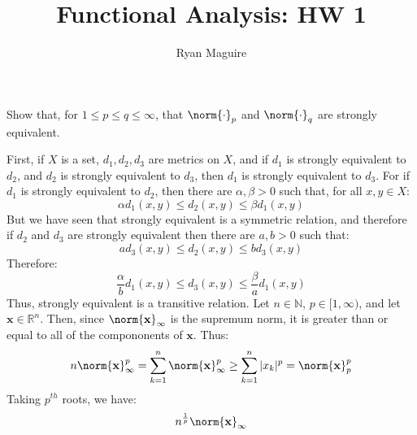 \documentclass[crop=false,class=article,oneside]{standalone}
\begin{document}
    \title{Functional Analysis: HW 1}
    \author{Ryan Maguire}
    \date{\vspace{-5ex}}
    \maketitle
    \setcounter{section}{1}
    \begin{problem}
        Show that, for $1\leq{p}\leq{q}\leq\infty$, that
        $\norm{\cdot}_{p}$ and $\norm{\cdot}_{q}$ are strongly
        equivalent.
    \end{problem}
    \begin{solution}
        First, if $X$ is a set, $d_{1},d_{2},d_{3}$ are metrics on
        $X$, and if $d_{1}$ is strongly equivalent to $d_{2}$, and
        $d_{2}$ is strongly equivalent to $d_{3}$, then $d_{1}$ is
        strongly equivalent to $d_{3}$. For if $d_{1}$ is strongly
        equivalent to $d_{2}$, then there are $\alpha,\beta>0$ such
        that, for all $x,y\in{X}$:
        \begin{equation}
            \alpha{d}_{1}(x,y)\leq{d}_{2}(x,y)\leq\beta{d}_{1}(x,y)
        \end{equation}
        But we have seen that strongly equivalent is a symmetric
        relation, and therefore if $d_{2}$ and $d_{3}$ are strongly
        equivalent then there are $a,b>0$ such that:
        \begin{equation}
            ad_{3}(x,y)\leq{d}_{2}(x,y)\leq{b}d_{3}(x,y)
        \end{equation}
        Therefore:
        \begin{equation}
            \frac{\alpha}{b}d_{1}(x,y)\leq{d}_{3}(x,y)
            \leq\frac{\beta}{a}d_{1}(x,y)
        \end{equation}
        Thus, strongly equivalent is a transitive relation.
        Let $n\in\mathbb{N}$, $p\in[1,\infty)$, and let
        $\mathbf{x}\in\mathbb{R}^{n}$. Then, since
        $\norm{\mathbf{x}}_{\infty}$ is the supremum norm, it is greater
        than or equal to all of the compononents of $\mathbf{x}$. Thus:
        \begin{equation}
            n\norm{\mathbf{x}}_{\infty}^{p}=
            \sum_{k=1}^{n}\norm{\mathbf{x}}_{\infty}^{p}
            \geq\sum_{k=1}^{n}|x_{k}|^{p}=\norm{\mathbf{x}}_{p}^{p}
        \end{equation}
        Taking $p^{th}$ roots, we have:
        \begin{equation}
            n^{\frac{1}{p}}\norm{\mathbf{x}}_{\infty}

\end{equation}
\end{solution}
\end{document}
